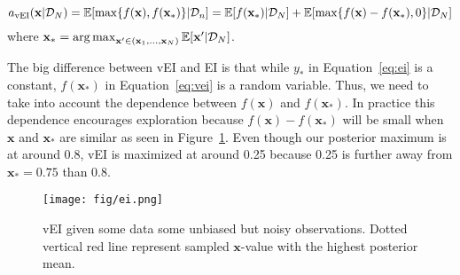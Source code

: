 \begin{definition}[vEI]
    \begin{equation}
        \label{eq:vei}
        a_{\mathrm{vEI}}(\mathbf{x} | \mathcal{D}_N) = \mathbb{E}[\max \{ f(\mathbf{x}), f(\mathbf{x}_*) \} | \mathcal{D}_n]
        = \mathbb{E}[f(\mathbf{x}_*) | \mathcal{D}_N] + \mathbb{E}[\max \{ f(\mathbf{x}) - f(\mathbf{x}_*), 0 \} | \mathcal{D}_N]
    \end{equation}
    where $\mathbf{x}_* = \operatorname*{arg\,max}_{\mathbf{x'} \in (\mathbf{x}_1, \dots, \mathbf{x}_N)} \mathbb{E}[\mathbf{x'} | \mathcal{D}_N]$.
\end{definition}

The big difference between vEI and EI is that while $y_*$ in Equation~\ref{eq:ei} is a constant, $f(\mathbf{x}_*)$ in Equation~\ref{eq:vei} is a random variable.
Thus, we need to take into account the dependence between $f(\mathbf{x})$ and $f(\mathbf{x}_*)$.
In practice this dependence encourages exploration because $f(\mathbf{x}) - f(\mathbf{x}_*)$ will be small when $\mathbf{x}$ and $\mathbf{x}_*$ are similar as seen in Figure~\ref{fig:ei}.
Even though our posterior maximum is at around 0.8, vEI is maximized at around 0.25 because 0.25 is further away from $\mathbf{x}_* = 0.75$ than 0.8.

\begin{figure}[t]
    \centering
    \texttt{[image: fig/ei.png]}
    \caption{vEI given some data some unbiased but noisy observations.
        Dotted vertical red line represent sampled $\mathbf{x}$-value with the highest posterior mean.
    }
    \label{fig:ei}

\end{figure}


